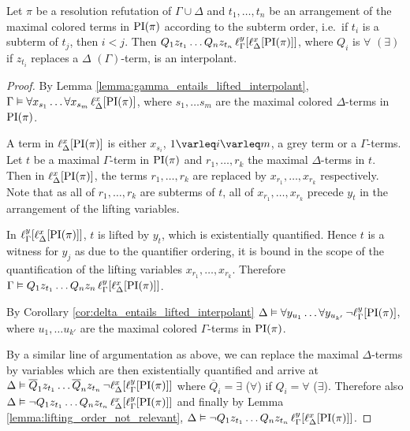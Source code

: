 \begin{thm}
	Let $\pi$ be a resolution refutation of $\Gamma \cup \Delta$ and
	$t_1, \dots, t_n$ be an arrangement of the maximal colored terms in $\PI(\pi)$ according to the subterm order, i.e.\ if $t_i$ is a subterm of $t_j$, then $i<j$.
	Then
	$Q_1 z_{t_1} \ldots Q_n z_{t_n}\,\lifgamma{\lifdelta{\PI(\pi)}}$, where $Q_i$ is $\forall$ $(\exists)$ if $z_{t_i}$ replaces a $\Delta$ $(\Gamma)$-term, is an interpolant.
\end{thm}
\begin{proof}
	By Lemma \ref{lemma:gamma_entails_lifted_interpolant}, $\Gamma \entails \forall x_{s_1} \ldots \forall x_{s_m}\,\lifdelta{\PI(\pi)}$, where $s_1, \dots s_m$ are the maximal colored $\Delta$-terms in $\PI(\pi)$.

	A term in $\lifdelta{\PI(\pi)}$ is either $x_{s_i}$, $1 \varleq i \varleq m$, a grey term or a $\Gamma$-terms.
	Let $t$ be a maximal $\Gamma$-term in $\PI(\pi)$ and ${r_1}, \dots, {r_k}$ the maximal $\Delta$-terms in\nolinebreak{} $t$.
	Then in $\lifdelta{\PI(\pi)}$, the terms ${r_1}, \dots, {r_k}$ are replaced by $x_{r_1}, \dots, x_{r_k}$ respectively.
	Note that as all of ${r_1}, \dots, {r_k}$ are subterms of $t$, all of $x_{r_1}, \dots, x_{r_k}$ precede $y_t$ in the arrangement of the lifting variables.


	In $\lifgamma{\lifdelta{\PI(\pi)}}$, $t$ is lifted by $y_t$, which is existentially quantified.
	Hence $t$ is a witness for $y_j$ as due to the quantifier ordering,
	it is bound in the scope of the quantification of the lifting variables $x_{r_1}, \dots, x_{r_k}$.
	Therefore $\Gamma \entails Q_1 z_{t_1} \ldots Q_n z_n\,\lifgamma{\lifdelta{\PI(\pi)}}$.

	By Corollary \ref{cor:delta_entails_lifted_interpolant} $\Delta \entails \forall y_{u_1} \dots \forall y_{u_{k'}}\,\lnot \lift{\Gamma}{\PI(\pi)}{y}$, where $u_1, \dots u_{k'}$ are the maximal colored $\Gamma$-terms in $\PI(\pi)$.

	By a similar line of argumentation as above, we can replace the maximal $\Delta$-\nolinebreak{}terms by variables which are then existentially quantified and arrive at
	$\Delta \entails\nolinebreak{} \overline Q_1 z_{t_1} \dots \overline Q_n z_{t_n}\,\lnot \lft{\Delta}{x}{\lft{\Gamma}{y}{\PI(\pi)}}$ where $\overline Q_i = \exists$ ($\forall$) if $Q_i = \forall$ ($\exists$).
	Therefore also
	$\Delta \entails\nolinebreak{} \lnot Q_1 z_{t_1} \dots Q_n z_{t_n}\,\lft{\Delta}{x}{\lft{\Gamma}{y}{\PI(\pi)}}$ and
	finally by Lemma \ref{lemma:lifting_order_not_relevant},
	$\Delta \entails\nolinebreak{} \lnot Q_1 z_{t_1} \dots Q_n z_{t_n}\,\lft{\Gamma}{y}{\lft{\Delta}{x}{\PI(\pi)}}$.


\end{proof}
